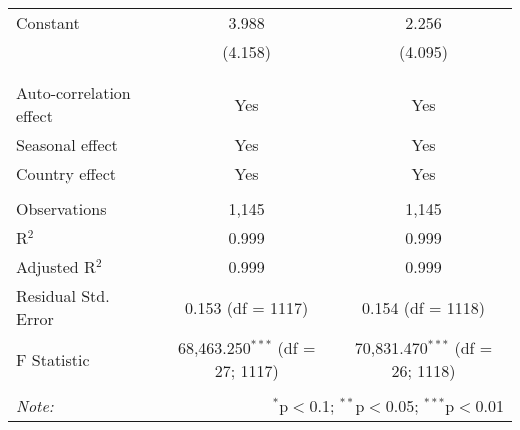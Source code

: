 \begin{table}[!htbp]
\begin{tabular}{@{\extracolsep{5pt}}lcc}
 Constant & 3.988 & 2.256 \\ 
  & (4.158) & (4.095) \\ 
  & & \\ 
\hline \\[-1.8ex] 
Auto-correlation effect & Yes & Yes \\ 
Seasonal effect & Yes & Yes \\ 
Country effect & Yes & Yes \\ 
\hline \\[-1.8ex] 
Observations & 1,145 & 1,145 \\ 
R$^{2}$ & 0.999 & 0.999 \\ 
Adjusted R$^{2}$ & 0.999 & 0.999 \\ 
Residual Std. Error & 0.153 (df = 1117) & 0.154 (df = 1118) \\ 
F Statistic & 68,463.250$^{***}$ (df = 27; 1117) & 70,831.470$^{***}$ (df = 26; 1118) \\ 
\hline 
\hline \\[-1.8ex] 
\textit{Note:}  & \multicolumn{2}{r}{$^{*}$p$<$0.1; $^{**}$p$<$0.05; $^{***}$p$<$0.01} \\ 
\end{tabular} 
\end{table} 
